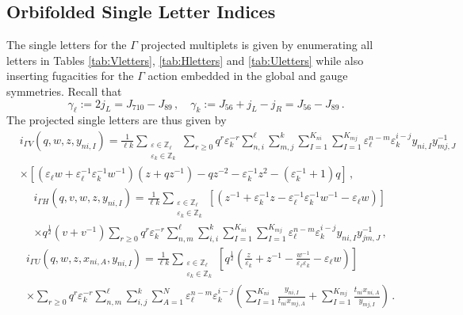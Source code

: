\documentclass[main.tex]{subfiles}
\begin{document}
\subsection{Orbifolded Single Letter Indices}
The single letters for the $\Gamma$ projected multiplets is given by enumerating all letters in Tables \ref{tab:Vletters}, \ref{tab:Hletters} and \ref{tab:Uletters} while also inserting fugacities for the $\Gamma$ action embedded in the global and gauge symmetries. Recall that 
\begin{equation}
\gamma_{\ell}:=2j_L=J_{710}-J_{89}\,,\quad \gamma_k:=J_{56}+j_L-j_R=J_{56}-J_{89}\,.
\end{equation}
The projected single letters are thus given by
\begin{equation}
\begin{aligned}
&i_{\Gamma V}(q,w,z,y_{ni,I})=\frac{1}{\ell k}\sum_{\substack{\varepsilon\in\mathbb{Z}_{\ell}\\\varepsilon_k\in\mathbb{Z}_k}}\sum_{r\geq0}q^r\varepsilon_k^{-r}\sum_{n,i}^{\ell}\sum_{m,j}^k\sum_{I=1}^{K_{ni}}\sum_{I=1}^{K_{mj}}\varepsilon_{\ell}^{n-m}\varepsilon_k^{i-j}y_{ni,I}y_{mj,J}^{-1}\\
&\times\left[\left(\varepsilon_{\ell}w+\varepsilon^{-1}_{\ell}\varepsilon_k^{-1}w^{-1}\right)\left(z+qz^{-1}\right)-qz^{-2}-\varepsilon_k^{-1}z^2-(\varepsilon_k^{-1}+1)q\right]\,,
\end{aligned}
\end{equation}
\begin{equation}
\begin{aligned}
&i_{\Gamma H}(q,v,w,z,y_{ni,I})=\frac{1}{\ell k}\sum_{\substack{\varepsilon\in\mathbb{Z}_{\ell}\\\varepsilon_k\in\mathbb{Z}_k}}\left[\left(z^{-1}+\varepsilon_k^{-1}z-\varepsilon_{\ell}^{-1}\varepsilon_k^{-1}w^{-1}-\varepsilon_{\ell}w\right)\right]\\
&\times q^{\frac{1}{2}}\left(v+v^{-1}\right)\sum_{r\geq0}q^r\varepsilon_k^{-r}\sum_{n,m}^{\ell}\sum_{i,i}^k\sum_{I=1}^{K_{ni}}\sum_{I=1}^{K_{mj}}\varepsilon_{\ell}^{n-m}\varepsilon_k^{i-j}y_{ni,I}y_{jm,J}^{-1}\,,
\end{aligned}
\end{equation}
\begin{equation}
\begin{aligned}
&i_{\Gamma U}(q,w,z,x_{ni,A},y_{ni,I})=\frac{1}{\ell k}\sum_{\substack{\varepsilon\in\mathbb{Z}_{\ell}\\\varepsilon_k\in\mathbb{Z}_k}}\left[q^{\frac{1}{2}}\left(\frac{z}{\varepsilon_k}+z^{-1}-\frac{w^{-1}}{\varepsilon_{\ell}\varepsilon_k}-\varepsilon_{\ell}w\right)\right]\\
&\times\sum_{r\geq0}q^r\varepsilon_k^{-r}\sum_{n,m}^{\ell}\sum_{i,j}^k\sum_{A=1}^{N}\varepsilon_{\ell}^{n-m}\varepsilon_k^{i-j}\left(\sum_{I=1}^{K_{ni}}\frac{y_{ni,I}}{t_{ni}x_{mj,A}}+\sum_{I=1}^{K_{mj}}\frac{t_{ni}x_{ni,A}}{y_{mj,I}}\right)\,.
\end{aligned}
\end{equation}
\end{document}
